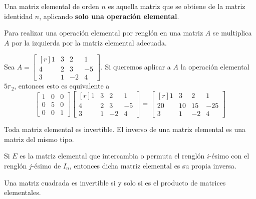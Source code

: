 \begin{definition}
    Una matriz elemental de orden $n$ es aquella matriz que se obtiene de la matriz identidad $n$, aplicando \textbf{solo una operación elemental}.
\end{definition}

\begin{theorem}
    Para realizar una operación elemental por renglón en una matriz $A$ se multiplica $A$ por la izquierda por la matriz elemental adecuada.
\end{theorem}

\begin{example}
    Sea $A = \begin{bmatrix*}[r]
        1 & 3 & 2 & 1 \\
        4 & 2 & 3 & -5 \\
        3 & 1 & -2 & 4
    \end{bmatrix*}$. Si queremos aplicar a $A$ la operación elemental $5\mathbb{r}_2$, entonces esto es equivalente a
    $$\begin{bmatrix}
        1 & 0 & 0 \\
        0 & 5 & 0 \\
        0 & 0 & 1
    \end{bmatrix} \begin{bmatrix*}[r]
        1 & 3 & 2 & 1 \\
        4 & 2 & 3 & -5 \\
        3 & 1 & -2 & 4
    \end{bmatrix*} = \begin{bmatrix*}[r]
        1 & 3 & 2 & 1 \\
        20 & 10 & 15 & -25 \\
        3 & 1 & -2 & 4
    \end{bmatrix*}$$
\end{example}

\begin{theorem}
    Toda matriz elemental es invertible. El inverso de una matriz elemental es una matriz del mismo tipo.
\end{theorem}

\begin{corollary}
    Si $E$ es la matriz elemental que intercambia o permuta el renglón $i$-ésimo con el renglón $j$-ésimo de $I_n$, entonces dicha matriz elemental es su propia inversa.
\end{corollary}

\begin{theorem}
    Una matriz cuadrada es invertible si y solo si es el producto de matrices elementales.
\end{theorem}


